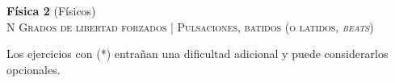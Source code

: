 \documentclass[11pt,spanish,a4paper]{article}
\begin{document}
\begin{center}
\textbf{Física 2} (Físicos) \hfill {}\\
	\textsc{\LARGE N Grados de libertad forzados | Pulsaciones, batidos (o latidos, \emph{beats})}
\end{center}

Los ejercicios con (*) entrañan una dificultad adicional y puede considerarlos opcionales.


\begin{enumerate}



								



\end{enumerate}
\end{document}
